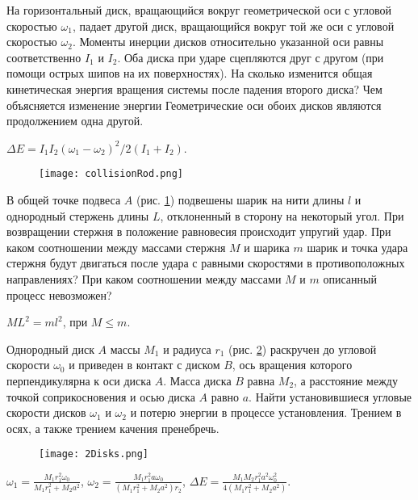 \begin{ex} %
На горизонтальный диск, вращающийся вокруг геометрической оси с угловой скоростью $\omega_1$, падает другой диск, вращающийся вокруг той же оси с угловой скоростью $\omega_2$. Моменты инерции дисков относительно указанной оси равны соответственно $I_1$ и $I_2$. Оба диска при ударе сцепляются друг с другом (при помощи острых шипов на их поверхностях). На сколько изменится общая кинетическая энергия вращения системы после падения второго диска? Чем объясняется изменение энергии Геометрические оси обоих дисков являются продолжением одна другой.
\begin{ans}
$\Delta E = I_1 I_2 (\omega_1 - \omega_2)^2/ 2(I_1 + I_2)$.
\end{ans}
\end{ex}	

\begin{figure}[h]
\centering
\texttt{[image: collisionRod.png]}
\caption{}
\label{collisionRod}
\end{figure}

\begin{ex} %
В общей точке подвеса $A$ (рис. \ref{collisionRod}) подвешены шарик на нити длины $l$ и однородный стержень длины $L$, отклоненный в сторону на некоторый угол. При возвращении стержня в положение равновесия происходит упругий удар. При каком соотношении между массами стержня $M$ и шарика $m$ шарик и точка удара стержня будут двигаться после удара с равными скоростями
в противоположных направлениях? При каком соотношении между
массами $M$ и $m$ описанный процесс невозможен?
\begin{ans}
$ML^2 = ml^2$, при $M \leq m$.
\end{ans}
\end{ex}	

\begin{ex} %
Однородный диск $A$ массы $M_1$ и радиуса $r_1$ (рис. \ref{2Disks}) раскручен до угловой скорости $\omega_0$ и приведен в контакт с диском $B$, ось вращения которого перпендикулярна к оси диска $A$. Масса диска $B$ равна $M_2$, а расстояние между точкой соприкосновения и осью диска $A$ равно $a$. Найти установившиеся угловые скорости дисков $\omega_1$ и $\omega_2$ и потерю энергии в процессе установления. Трением в осях, а также трением качения пренебречь.

\begin{figure}[h]
\centering
\texttt{[image: 2Disks.png]}
\caption{}
\label{2Disks}
\end{figure}

\begin{ans}
$\omega_1 = \frac{M_1r_1^2\omega_0}{M_1r_1^2 + M_2a^2}$, $\omega_2 = \frac{M_1r_1^2 a \omega_0}{(M_1r_1^2 + M_2a^2)r_2}$, $\Delta E = \frac{M_1 M_2r_1^2a^2\omega_0^2}{4(M_1r_1^2 + M_2a^2)}$.
\end{ans}
\end{ex}	

